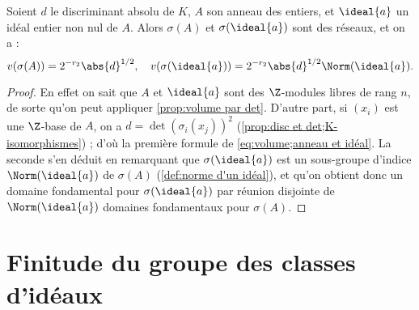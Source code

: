 \documentclass[11pt, useosf,
  title in boldface,
  theorem in new line,
  theorem numbering = section,
  number theorems separately,
]{simplivre}
\begin{document}
    \begin{proposition}\label{prop:volume;anneau et idéal}
        Soient \( d \) le discriminant absolu de \( K \), \( A \) son anneau des entiers, et \( \ideal{a} \) un idéal entier non nul de \( A \). Alors \( \sigma(A) \) et \( \sigma(\ideal{a}) \) sont des réseaux, et on a :
        \begin{equation}\label{eq:volume;anneau et idéal}
            v(\sigma(A)) = 2^{-r_2} \abs{d}^{1/2}, \quad
            v(\sigma(\ideal{a})) = 2^{-r_2} \abs{d}^{1/2} \Norm(\ideal{a}).
        \end{equation}
    \end{proposition}
    \begin{proof}
        En effet on sait que \( A \) et \( \ideal{a} \) sont des \( \Z \)‑modules libres de rang \( n \), de sorte qu'on peut appliquer \cref{prop:volume par det}. D'autre part, si \( (x_i) \) est une \( \Z \)‑base de \( A \), on a \( d = \det(\sigma_i(x_j))^2 \) (\cref{prop:disc et det;K-isomorphismes}) ; d'où la première formule de \eqref{eq:volume;anneau et idéal}. La seconde s'en déduit en remarquant que \( \sigma(\ideal{a}) \) est un sous-groupe d'indice \( \Norm(\ideal{a}) \) de \( \sigma(A) \) (\cref{def:norme d'un idéal}), et qu'on obtient donc un domaine fondamental pour \( \sigma(\ideal{a}) \) par réunion disjointe de \( \Norm(\ideal{a}) \) domaines fondamentaux pour \( \sigma(A) \).
    \end{proof}

\enlargethispage*{\baselineskip}
\section{Finitude du groupe des classes d'idéaux}\label{sec:finitude du groupe des classes d'idéaux}
\end{document}
